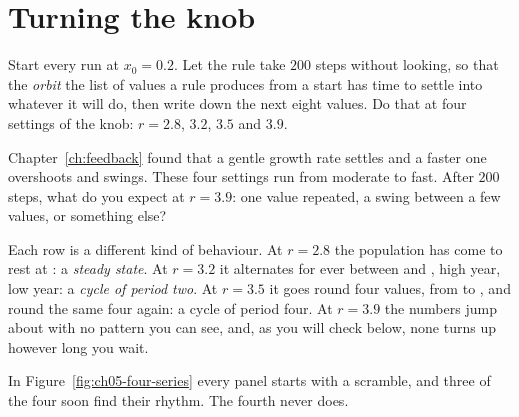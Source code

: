 \section{Turning the knob}
\label{sec:ch05-knob}

\noindent
Start every run at $x_0 = \num{0.2}$. Let the rule take $200$ steps without
looking, so that the \emph{orbit} \dash{} the list of values a rule produces
from a start \dash{} has time to settle into whatever it will do, then write
down the next eight values. Do that at four settings of the knob:
$r = \num{2.8}$, $\num{3.2}$, $\num{3.5}$ and $\num{3.9}$.

\begin{think}
Chapter~\ref{ch:feedback} found that a gentle growth rate settles and a
faster one overshoots and swings. These four settings run from moderate to
fast. After $200$ steps, what do you expect at $r = \num{3.9}$: one value
repeated, a swing between a few values, or something else?
\end{think}



\noindent
Each row is a different kind of behaviour. At $r = \num{2.8}$ the population
has come to rest at : a \emph{steady state}. At
$r = \num{3.2}$ it alternates for ever between  and
, high year, low year: a \emph{cycle of period two}. At
$r = \num{3.5}$ it goes round four values, from  to
, and round the same four again: a cycle of period four.
At $r = \num{3.9}$ the numbers jump about with no pattern you can see, and,
as you will check below, none turns up however long you wait.


\noindent
In Figure~\ref{fig:ch05-four-series} every panel starts with a scramble,
and three of the four soon find their rhythm. The fourth never does.


